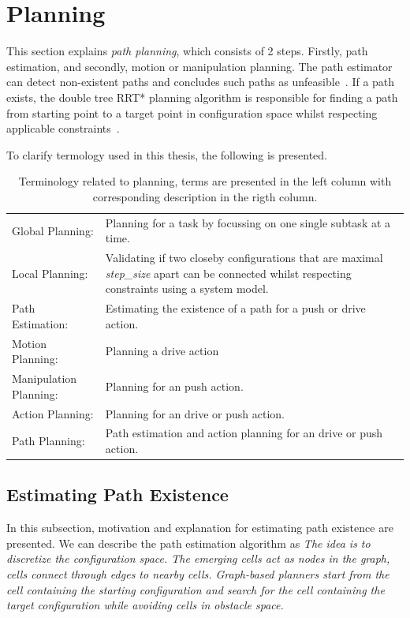 \section{Planning}%
\label{sec:planning}
This section explains \textit{path planning}, which consists of 2 steps. Firstly, path estimation, and secondly, motion or manipulation planning. The path estimator can detect non-existent paths and concludes such paths as unfeasible~\cite{zhang_simple_2008}. If a path exists, the double tree \ac{RRT*} planning algorithm is responsible for finding a path from starting point to a target point in configuration space whilst respecting applicable constraints~\cite{chen_fast_2018}.\bs

To clarify termology used in this thesis, the following  is presented.\bs
\noindent
\begin{table}[H]
  \centering
  \begin{tabular}%
  {>{\raggedright\arraybackslash}p{}%
   >{\raggedright\arraybackslash}p{}}
  Global Planning:& Planning for a task by focussing on one single subtask at a time. \\
  Local Planning:& Validating if two closeby configurations that are maximal \textit{step\_size} apart can be connected whilst respecting constraints using a system model.\\
  Path Estimation:& Estimating the existence of a path for a push or drive action.\\
  Motion Planning:& Planning a drive action\\
  Manipulation Planning:& Planning for an push action.\\
  Action Planning:& Planning for an drive or push action.\\
  Path Planning:& Path estimation and action planning for an drive or push action.\\
  \end{tabular}
\caption{Terminology related to planning, terms are presented in the left column with corresponding description in the rigth column.}%
\label{table:termology_planning}
\end{table}

\subsection{Estimating Path Existence}%
\label{subsec:path_estimation}
In this subsection, motivation and explanation for estimating path existence are presented. We can describe the path estimation algorithm as \textit{The idea is to discretize the configuration space. The emerging cells act as nodes in the graph, cells connect through edges to nearby cells. Graph-based planners start from the cell containing the starting configuration and search for the cell containing the target configuration while avoiding cells in obstacle space.\bs}

